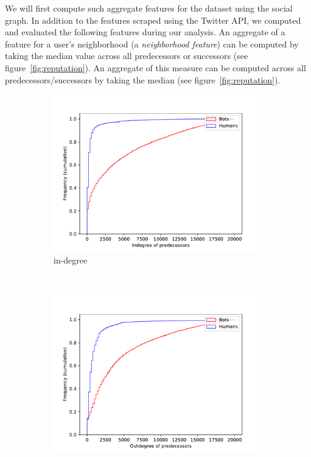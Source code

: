 \bigskip

We will first compute such aggregate features for the dataset using the social graph. In addition to the features scraped using the Twitter API, we computed and evaluated the following features during our analysis. An aggregate of a  feature for a user's neighborhood (a \emph{neighborhood feature}) can be computed by taking the median value across all predecessors or successors (see figure~\ref{fig:reputation}). An aggregate of this measure can be computed across all predecessors/successors by taking the median (see figure~\ref{fig:reputation}).

\begin{figure}[t!]
    \centering
    \begin{subfigure}[t]{0.5\textwidth}
        \centering
        \includegraphics[width=\textwidth]{FIG/indegree_pre.pdf}
        \caption{in-degree}
    \end{subfigure}%
    ~ 
    \begin{subfigure}[t]{0.5\textwidth}
        \centering
        \includegraphics[width=\textwidth]{FIG/outdegree_pre.pdf}

\end{subfigure}
\end{figure}
